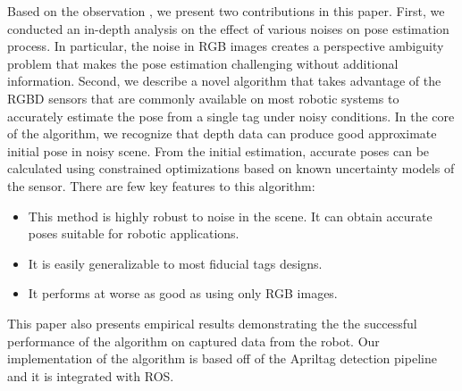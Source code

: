 Based on the observation , we present two contributions in this paper. First, we conducted an in-depth analysis on the effect of various noises on pose estimation process. In particular, the noise in RGB images creates a perspective ambiguity problem that makes the pose estimation challenging without additional information. Second, we describe a novel algorithm that takes advantage of the RGBD sensors that are commonly available on most robotic systems to accurately estimate the pose from a single tag under noisy conditions. In the core of the algorithm,  we recognize that depth data can produce good approximate initial pose in noisy scene. From the initial estimation, accurate poses can be calculated using constrained optimizations based on known uncertainty models of the sensor. There are few key features to this algorithm: 
\begin{itemize}
\item This method is highly robust to noise in the scene. It can obtain accurate poses suitable for robotic applications.   
\item It is easily generalizable to most fiducial tags designs.
\item It performs at worse  as good as using only RGB images.
\end{itemize}

This paper also presents empirical results demonstrating the the successful performance of the algorithm on captured data from the robot. Our implementation of the algorithm is based off of the Apriltag detection pipeline and it is integrated with ROS. 
